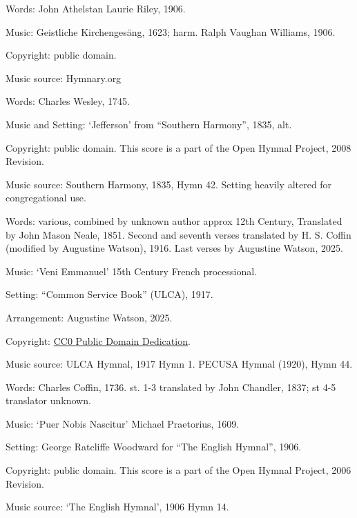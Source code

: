 \begin{multicols}{2}
\par\noindent
Words: John Athelstan Laurie Riley, 1906.
\par\noindent
Music: Geistliche Kirchengesäng, 1623; harm. Ralph Vaughan Williams, 1906.
\par\noindent
Copyright: public domain.
\par\noindent
Music source: Hymnary.org

\par\noindent
Words: Charles Wesley, 1745. 
\par\noindent
Music and Setting: `Jefferson'  from ``Southern Harmony'', 1835, alt.
\par\noindent
Copyright: public domain.  This score is a part of the Open Hymnal Project, 2008 Revision.
\par\noindent
Music source: Southern Harmony, 1835, Hymn 42.  Setting heavily altered for congregational use.


\par\noindent
Words: various, combined by unknown author approx 12th Century, Translated by John Mason Neale, 1851. Second and seventh verses translated by H. S. Coffin (modified by Augustine Watson), 1916. Last verses by Augustine Watson, 2025.
\par\noindent
Music: `Veni Emmanuel' 15th Century French processional.
\par\noindent
Setting: ``Common Service Book'' (ULCA), 1917. 
\par\noindent
Arrangement: Augustine Watson, 2025.
\par\noindent
Copyright: \href{https://creativecommons.org/publicdomain/zero/1.0/}{CC0 Public Domain Dedication}.
\par\noindent
Music source: ULCA Hymnal, 1917 Hymn 1. PECUSA Hymnal (1920), Hymn 44.

\par\noindent
Words: Charles Coffin, 1736. st. 1-3 translated by John Chandler, 1837; st 4-5 translator unknown.  
\par\noindent
Music: `Puer Nobis Nascitur' Michael Praetorius, 1609. 
\par\noindent
Setting: George Ratcliffe Woodward for ``The English Hymnal'', 1906.
\par\noindent
Copyright: public domain. This score is a part of the Open Hymnal Project, 2006 Revision.
\par\noindent
Music source: `The English Hymnal', 1906 Hymn 14.


\end{multicols}
